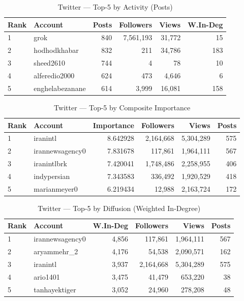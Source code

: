 \documentclass{article}
\begin{document}
\begin{table}[h!]
	\centering
	\begin{tabular}{llrrrr}
		\toprule
		Rank & Account & Posts & Followers & Views & W.In-Deg \\
		\midrule
		1 & grok             & 840 & 7,561,193 & 31,772 & 15  \\
		2 & hodhodkhabar     & 832 & 211       & 34,786 & 183 \\
		3 & sheed2610        & 744 & 4         & 78     & 10  \\
		4 & alferedio2000    & 624 & 473       & 4,646  & 6   \\
		5 & enghelabezanane  & 614 & 3,999     & 16,081 & 158 \\
		\bottomrule
	\end{tabular}
	\caption{Twitter — Top-5 by Activity (Posts)}
\end{table}


\begin{table}[h!]
	\centering
	\begin{tabular}{llrrrr}
		\toprule
		Rank & Account & Importance & Followers & Views & Posts \\
		\midrule
		1 & iranintl        & 8.642928 & 2,164,668 & 5,304,289 & 575 \\
		2 & irannewsagency0 & 7.831678 & 117,861   & 1,964,111 & 567 \\
		3 & iranintlbrk     & 7.420041 & 1,748,486 & 2,258,955 & 406 \\
		4 & indypersian     & 7.343583 & 336,492   & 1,920,529 & 418 \\
		5 & marianmeyer0    & 6.219434 & 12,988    & 2,163,724 & 172 \\
		\bottomrule
	\end{tabular}
	\caption{Twitter — Top-5 by Composite Importance}
\end{table}


\begin{table}[h!]
	\centering
	\begin{tabular}{llrrrr}
		\toprule
		Rank & Account & W.In-Deg & Followers & Views & Posts \\
		\midrule
		1 & irannewsagency0 & 4,856 & 117,861  & 1,964,111 & 567 \\
		2 & aryammehr\_2    & 4,176 & 54,538   & 2,090,571 & 162 \\
		3 & iranintl        & 3,937 & 2,164,668& 5,304,289 & 575 \\
		4 & ario1401        & 3,475 & 41,479   & 653,220   & 38  \\
		5 & tanhayektiger   & 3,052 & 24,960   & 278,208   & 48  \\
		\bottomrule
	\end{tabular}
	\caption{Twitter — Top-5 by Diffusion (Weighted In-Degree)}
\end{table}
\end{document}
